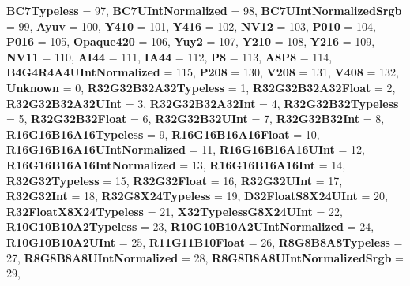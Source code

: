 \begin{DoxyCompactItemize}
\newline
{\bfseries B\+C7\+Typeless} = 97, 
{\bfseries B\+C7\+U\+Int\+Normalized} = 98, 
{\bfseries B\+C7\+U\+Int\+Normalized\+Srgb} = 99, 
{\bfseries Ayuv} = 100, 
\newline
{\bfseries Y410} = 101, 
{\bfseries Y416} = 102, 
{\bfseries N\+V12} = 103, 
{\bfseries P010} = 104, 
\newline
{\bfseries P016} = 105, 
{\bfseries Opaque420} = 106, 
{\bfseries Yuy2} = 107, 
{\bfseries Y210} = 108, 
\newline
{\bfseries Y216} = 109, 
{\bfseries N\+V11} = 110, 
{\bfseries A\+I44} = 111, 
{\bfseries I\+A44} = 112, 
\newline
{\bfseries P8} = 113, 
{\bfseries A8\+P8} = 114, 
{\bfseries B4\+G4\+R4\+A4\+U\+Int\+Normalized} = 115, 
{\bfseries P208} = 130, 
\newline
{\bfseries V208} = 131, 
{\bfseries V408} = 132, 
{\bfseries Unknown} = 0, 
{\bfseries R32\+G32\+B32\+A32\+Typeless} = 1, 
\newline
{\bfseries R32\+G32\+B32\+A32\+Float} = 2, 
{\bfseries R32\+G32\+B32\+A32\+U\+Int} = 3, 
{\bfseries R32\+G32\+B32\+A32\+Int} = 4, 
{\bfseries R32\+G32\+B32\+Typeless} = 5, 
\newline
{\bfseries R32\+G32\+B32\+Float} = 6, 
{\bfseries R32\+G32\+B32\+U\+Int} = 7, 
{\bfseries R32\+G32\+B32\+Int} = 8, 
{\bfseries R16\+G16\+B16\+A16\+Typeless} = 9, 
\newline
{\bfseries R16\+G16\+B16\+A16\+Float} = 10, 
{\bfseries R16\+G16\+B16\+A16\+U\+Int\+Normalized} = 11, 
{\bfseries R16\+G16\+B16\+A16\+U\+Int} = 12, 
{\bfseries R16\+G16\+B16\+A16\+Int\+Normalized} = 13, 
\newline
{\bfseries R16\+G16\+B16\+A16\+Int} = 14, 
{\bfseries R32\+G32\+Typeless} = 15, 
{\bfseries R32\+G32\+Float} = 16, 
{\bfseries R32\+G32\+U\+Int} = 17, 
\newline
{\bfseries R32\+G32\+Int} = 18, 
{\bfseries R32\+G8\+X24\+Typeless} = 19, 
{\bfseries D32\+Float\+S8\+X24\+U\+Int} = 20, 
{\bfseries R32\+Float\+X8\+X24\+Typeless} = 21, 
\newline
{\bfseries X32\+Typeless\+G8\+X24\+U\+Int} = 22, 
{\bfseries R10\+G10\+B10\+A2\+Typeless} = 23, 
{\bfseries R10\+G10\+B10\+A2\+U\+Int\+Normalized} = 24, 
{\bfseries R10\+G10\+B10\+A2\+U\+Int} = 25, 
\newline
{\bfseries R11\+G11\+B10\+Float} = 26, 
{\bfseries R8\+G8\+B8\+A8\+Typeless} = 27, 
{\bfseries R8\+G8\+B8\+A8\+U\+Int\+Normalized} = 28, 
{\bfseries R8\+G8\+B8\+A8\+U\+Int\+Normalized\+Srgb} = 29, 

\end{DoxyCompactItemize}
